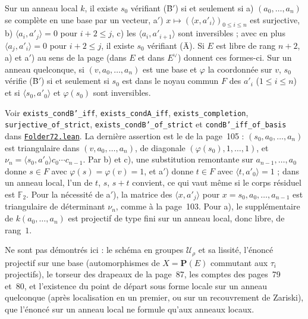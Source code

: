 \begin{encadre}
\begin{theoreme}
Sur un anneau local $k$, il existe $s_0$ vérifiant (B̄$'$)  si et seulement si a) $(a_0, \dots, a_n)$ se complète en une base par un vecteur, a$'$) $x \mapsto (\langle x, a'_i\rangle)_{0 \leq i \leq n}$ est surjective, b) $\langle a_i, a'_j\rangle = 0$ pour $i + 2 \leq j$, c) les $\langle a_i, a'_{i+1}\rangle$ sont inversibles ; avec en plus $\langle a_j, a'_i\rangle = 0$ pour $i + 2 \leq j$, il existe $s_0$ vérifiant (Ā). Si $E$ est libre de rang $n + 2$, a) et a$'$) au sens  de la page (dans $E$ et dans $E^\vee$) donnent ces formes-ci. Sur un anneau quelconque, si $(v, a_0, \dots, a_n)$ est une base et $\varphi$ la coordonnée sur $v$, $s_0$ vérifie (B̄$'$) si et seulement si $s_0$ est dans le noyau commun $F$ des $a'_i$ ($1 \leq i \leq n$) et si $\langle s_0, a'_0\rangle$ et $\varphi(s_0)$ sont inversibles.
\end{theoreme}
\end{encadre}

\begingroup\raggedright
\noindent Voir \texttt{exists\_condB'\_iff}, \texttt{exists\_condA\_iff}, \texttt{exists\_completion}, \texttt{surjective\_of\_strict}, \texttt{exists\_condB'\_of\_strict} et \texttt{condB'\_iff\_of\_basis} dans \href{\leanblob/Geometry/Folder72.lean}{\texttt{Folder72.\allowbreak{}lean}}. La dernière assertion est le  de la page~105 : $(s_0, a_0, \dots, a_n)$ est triangulaire dans $(v, a_0, \dots, a_n)$, de diagonale $(\varphi(s_0), 1, \dots, 1)$, et $\nu_n = \langle s_0, a'_0\rangle c_0 \cdots c_{n-1}$. Par b) et c), une substitution remontante sur $a_{n-1}, \dots, a_0$ donne $s \in F$ avec $\varphi(s) = \varphi(v) = 1$, et a$'$) donne $t \in F$ avec $\langle t, a'_0\rangle = 1$ ; dans un anneau local, l'un de $t$, $s$, $s + t$ convient, ce qui vaut même si le corps résiduel est $\mathbb F_2$. Pour la nécessité de a$'$), la matrice des $\langle x, a'_j\rangle$ pour $x = s_0, a_0, \dots, a_{n-1}$ est triangulaire de déterminant $\nu_n$, comme à la page~103. Pour a), le supplémentaire de $k(a_0, \dots, a_n)$ est projectif de type fini sur un anneau local, donc libre, de rang~$1$.\par\endgroup

Ne sont pas démontrés ici : le schéma en groupes $\mathcal U_\rho$ et sa lissité, l'énoncé projectif sur une base (automorphismes de $X = \mathbf P(E)$ commutant aux $\tau_i$ projectifs), le torseur des drapeaux de la page~87, les comptes des pages~79 et~80, et l'existence du point de départ sous forme locale sur un anneau quelconque (après localisation en un premier, ou sur un recouvrement de Zariski), que l'énoncé sur un anneau local ne formule qu'aux anneaux locaux.
